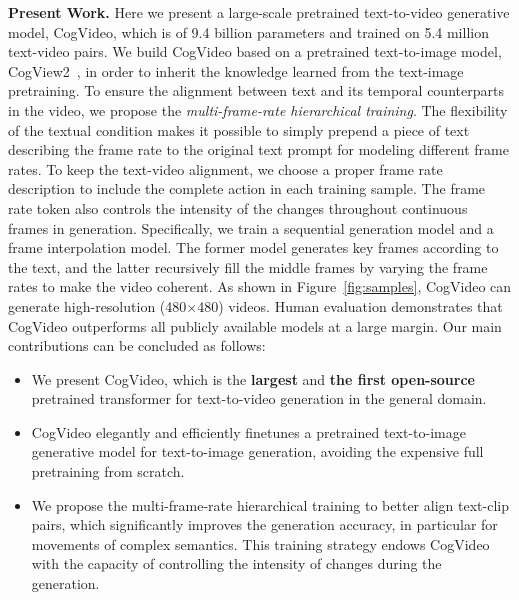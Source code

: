 \textbf{Present Work. }Here we present a large-scale pretrained text-to-video generative model, CogVideo, which is of 9.4 billion parameters  and trained on 5.4 million text-video pairs. We build  CogVideo  based on a pretrained text-to-image model, CogView2~\cite{ding2022cogview2}, in order to inherit the knowledge learned from the text-image pretraining. To ensure the alignment between text and its temporal counterparts in the video, we propose the \emph{multi-frame-rate hierarchical training}. The flexibility of the textual condition makes it possible to simply prepend a piece of text describing the frame rate to the original text prompt for modeling different frame rates. To keep the text-video alignment, we  choose a proper frame rate description to include the complete action in each training sample. The frame rate token also controls the intensity of the changes throughout continuous frames in generation. Specifically, we train a sequential generation model and a frame interpolation model. The former model generates key frames according to the text, and the latter recursively fill the middle frames by varying the frame rates to make the video coherent. As shown in Figure~\ref{fig:samples}, CogVideo can generate high-resolution (480$\times$480) videos. Human evaluation demonstrates that CogVideo outperforms all publicly available models at a large margin. 
Our main contributions can be concluded as follows:

\begin{itemize}
    \item We present CogVideo, which is 
    the \textbf{largest} and \textbf{the first open-source} pretrained transformer for text-to-video generation in the general domain. 
    \item CogVideo 
    elegantly and efficiently finetunes a pretrained text-to-image generative model for text-to-image generation, avoiding the expensive full pretraining from scratch.
    
    \item We propose the multi-frame-rate hierarchical training to better align text-clip pairs, which significantly improves the generation accuracy, in particular for movements of  complex semantics. This training strategy 
    endows CogVideo with the capacity of controlling the intensity of changes during the generation. 
\end{itemize}


